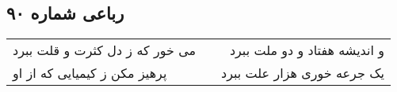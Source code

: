 \begin{center}
\section*{رباعی شماره ۹۰}
\label{sec:sh090}
\begin{longtable}{l p{0.5cm} r}
می خور که ز دل کثرت و قلت ببرد
&&
و اندیشه هفتاد و دو ملت ببرد
\\
پرهیز مکن ز کیمیایی که از او
&&
یک جرعه خوری هزار علت ببرد
\\
\end{longtable}
\end{center}
